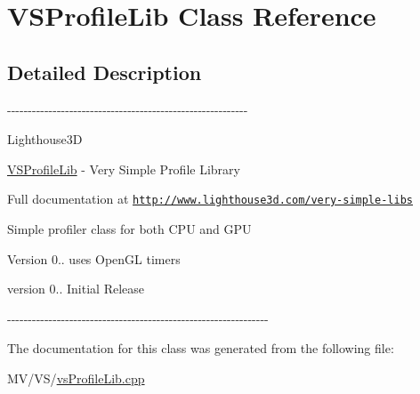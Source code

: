 \hypertarget{class_v_s_profile_lib}{\section{\-V\-S\-Profile\-Lib \-Class \-Reference}
\label{class_v_s_profile_lib}
}


\subsection{\-Detailed \-Description}
-\/-\/-\/-\/-\/-\/-\/-\/-\/-\/-\/-\/-\/-\/-\/-\/-\/-\/-\/-\/-\/-\/-\/-\/-\/-\/-\/-\/-\/-\/-\/-\/-\/-\/-\/-\/-\/-\/-\/-\/-\/-\/-\/-\/-\/-\/-\/-\/-\/-\/-\/-\/-\/-\/-\/-\/-\/-\/

\-Lighthouse3\-D

\hyperlink{class_v_s_profile_lib}{\-V\-S\-Profile\-Lib} -\/ \-Very \-Simple \-Profile \-Library

\-Full documentation at \href{http://www.lighthouse3d.com/very-simple-libs}{\tt http\-://www.\-lighthouse3d.\-com/very-\/simple-\/libs}

\-Simple profiler class for both \-C\-P\-U and \-G\-P\-U

\begin{DoxyVersion}{\-Version}
0.. uses \-Open\-G\-L timers
\end{DoxyVersion}
version 0.. \-Initial \-Release

-\/-\/-\/-\/-\/-\/-\/-\/-\/-\/-\/-\/-\/-\/-\/-\/-\/-\/-\/-\/-\/-\/-\/-\/-\/-\/-\/-\/-\/-\/-\/-\/-\/-\/-\/-\/-\/-\/-\/-\/-\/-\/-\/-\/-\/-\/-\/-\/-\/-\/-\/-\/-\/-\/-\/-\/-\/-\/-\/-\/-\/-\/-\/ 

\-The documentation for this class was generated from the following file\-:\begin{DoxyCompactItemize}
\item 
\-M\-V/\-V\-S/\hyperlink{vs_profile_lib_8cpp}{vs\-Profile\-Lib.\-cpp}\end{DoxyCompactItemize}
